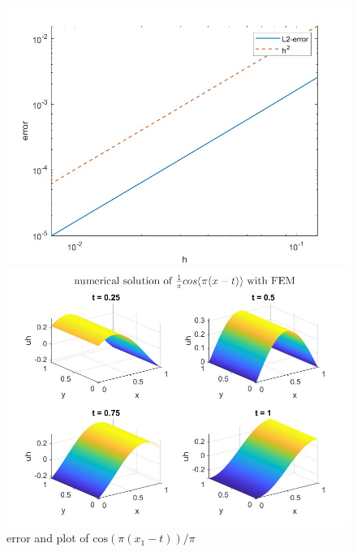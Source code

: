 \documentclass{article}
\begin{document}
\begin{figure}[!h]
\label{fig:E3}
	\begin{minipage}[c]{0.5\linewidth}
		\includegraphics[width=\linewidth]{E3error.jpg}
	\end{minipage}
	\begin{minipage}[c]{0.5\linewidth}
		\includegraphics[width=\linewidth]{E3NumSol.jpg}
	\end{minipage}
	\caption{error and plot of $\text{cos}(\pi(x_1-t))/\pi$ }
\end{figure}
\end{document}
